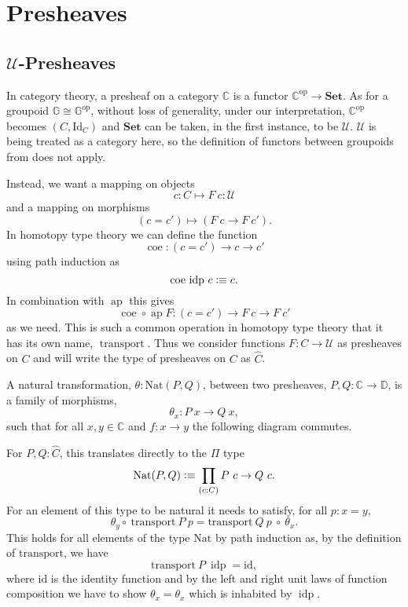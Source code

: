 \documentclass[12pt, parskip, DIV=14]{scrbook}
\newcommand{\defeq}{\vcentcolon\equiv}
\renewcommand{\circ}{\vysmwhtcircle}
\newcommand{\ap}{\operatorname{ap}}
\newcommand{\idp}{\operatorname{idp}}
\newcommand{\coe}{\operatorname{coe}}
\newcommand{\transport}{\operatorname{transport}}
\begin{document}
\chapter{Presheaves}

\section{$\mathcal{U}$-Presheaves}

In category theory, a presheaf on a category $\mathbb{C}$ is a functor $\mathbb{C}^{\mathrm{op}} \to \mathbf{Set}$. As for a groupoid $\mathbb{G} \cong \mathbb{G}^{\mathrm{op}}$, without loss of generality, under our interpretation, $\mathbb{C}^{\mathrm{op}}$ becomes $(C , \mathrm{Id}_C)$ and $\mathbf{Set}$ can be taken, in the first instance, to be $\mathcal{U}$. $\mathcal{U}$ is being treated as a category here, so the definition of functors between groupoids from  does not apply.

Instead, we want a mapping on objects
$$c : C \mapsto F~c : \mathcal{U}$$
and a mapping on morphisms
$$(c = c') \mapsto (F~c \to F~c').$$ In homotopy type theory we can define the function
$$\coe : (c = c') \to c \to c'$$
using path induction as
$$\coe\,\idp\,c \defeq c.$$
In combination with $\ap$ this gives
$$\coe \circ \ap F : (c = c') \to F~c \to F~c'$$
as we need. This is such a common operation in homotopy type theory that it has its own name, $\transport$. Thus we consider functions $F : C \to \mathcal{U}$ as presheaves on $C$ and will write the type of presheaves on $C$ as $\widehat{C}$.

A natural transformation, $\theta : \mathrm{Nat}(P , Q)$, between two presheaves, $P , Q : \mathbb{C} \to \mathbb{D}$, is a family of morphisms, $$\theta_x : P~x \to Q~x,$$ such that for all $x , y \in \mathbb{C}$ and $f : x \to y$ the following diagram commutes.

\begin{center}
\end{center}

For $P , Q : \widehat{C}$, this translates directly to the $\Pi$ type $$\mathrm{Nat}(P,Q) \defeq \prod_{(c : C)} P~c \to Q~c.$$ For an element of this type to be natural it needs to satisfy, for all $p : x = y$, $$\theta_y \circ~\mathrm{transport}~P~p = \mathrm{transport}~Q~p~\circ~\theta_x.$$
This holds for all elements of the type $\mathrm{Nat}$ by path induction as, by the definition of $\mathrm{transport}$, we have $$\mathrm{transport}~P~\idp = \mathrm{id},$$ where $\mathrm{id}$ is the identity function and by the left and right unit laws of function composition we have to show $\theta_x = \theta_x$ which is inhabited by $\idp$.
\end{document}

